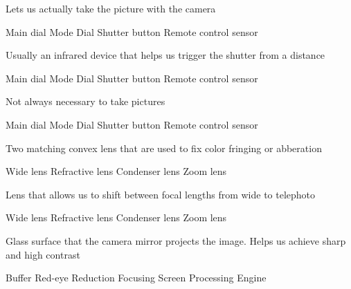 \documentclass[theme=sleek, randomorder, hidesidemenu]{webquiz}
\begin{document}
\begin{question}
  Lets us actually take the picture with the camera
  \begin{choice}[columns=2]
    \incorrect Main dial
    \incorrect Mode Dial
    \correct Shutter button
    \incorrect Remote control sensor
  \end{choice}
\end{question}

\begin{question}
  Usually an infrared device that helps us trigger the shutter from a distance
  \begin{choice}[columns=2]
    \incorrect Main dial
    \incorrect Mode Dial
    \incorrect Shutter button
    \correct Remote control sensor
  \end{choice}
\end{question}

\begin{question}
  Not always necessary to take pictures
  \begin{choice}[columns=2]
    \incorrect Main dial
    \incorrect Mode Dial
    \incorrect Shutter button
    \correct Remote control sensor
  \end{choice}
\end{question}

\begin{question}
  Two matching convex lens that are used to fix color fringing or abberation
  \begin{choice}[columns=2]
    \incorrect Wide lens
    \incorrect Refractive lens
    \correct Condenser lens
    \incorrect Zoom lens
  \end{choice}
\end{question}

\begin{question}
  Lens that allows us to shift between focal lengths from wide to telephoto
  \begin{choice}[columns=2]
    \incorrect Wide lens
    \incorrect Refractive lens
    \incorrect Condenser lens
    \correct Zoom lens
  \end{choice}
\end{question}

\begin{question}
 Glass surface that the camera mirror projects the image. Helps us achieve sharp and high contrast
  \begin{choice}[columns=2]
    \incorrect Buffer
    \incorrect Red-eye Reduction
    \correct Focusing Screen
    \incorrect Processing Engine
  \end{choice}
\end{question}
\end{document}
